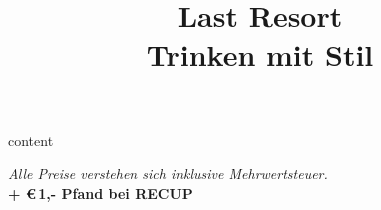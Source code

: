 \documentclass[a4paper,12pt]{article}
\title{\Huge\textbf{Last Resort}\\\Large Trinken mit Stil}
\date{}
\begin{document}
\maketitle
{}

{content}

\vfill
\begin{center}
\small\textit{Alle Preise verstehen sich inklusive Mehrwertsteuer.}\\
\textbf{+ €\,1{,}- Pfand bei RECUP}
\end{center}
\end{document}
